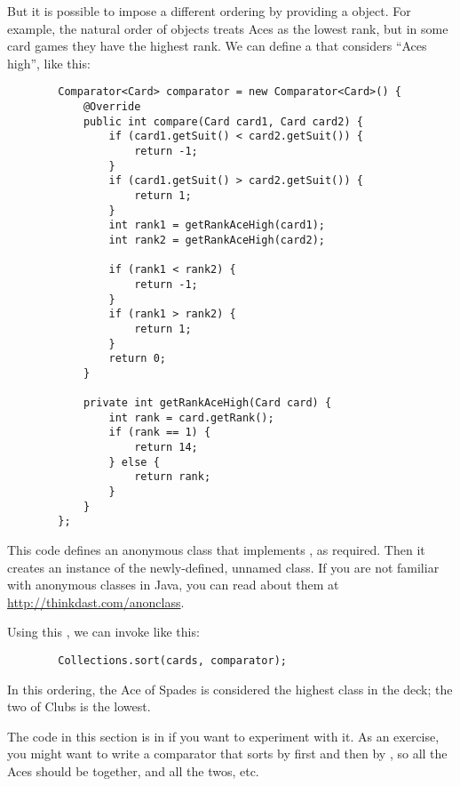 \documentclass[12pt]{book}
\theoremstyle{exercise}
\begin{document}

But it is possible to impose a different ordering by providing a
 object. For example, the natural order of
 objects treats Aces as the lowest rank, but in some card
games they have the highest rank. We can define a 
that considers ``Aces high'', like this:

\begin{verbatim}
        Comparator<Card> comparator = new Comparator<Card>() {
            @Override
            public int compare(Card card1, Card card2) {
                if (card1.getSuit() < card2.getSuit()) {
                    return -1;
                }
                if (card1.getSuit() > card2.getSuit()) {
                    return 1;
                }
                int rank1 = getRankAceHigh(card1);
                int rank2 = getRankAceHigh(card2);

                if (rank1 < rank2) {
                    return -1;
                }
                if (rank1 > rank2) {
                    return 1;
                }
                return 0;
            }

            private int getRankAceHigh(Card card) {
                int rank = card.getRank();
                if (rank == 1) {
                    return 14;
                } else {
                    return rank;
                }
            }
        };
\end{verbatim}

This code defines an anonymous class that implements ,
as required. Then it creates an instance of the newly-defined, unnamed
class. If you are not familiar with anonymous classes in Java, you can
read about them at \url{http://thinkdast.com/anonclass}.


Using this , we can invoke  like this:

\begin{verbatim}
        Collections.sort(cards, comparator);
\end{verbatim}

In this ordering, the Ace of Spades is considered the highest class in
the deck; the two of Clubs is the lowest.


The code in this section is in  if you want to
experiment with it. As an exercise, you might want to write a comparator
that sorts by  first and then by , so all the
Aces should be together, and all the twos, etc.
\end{document}
